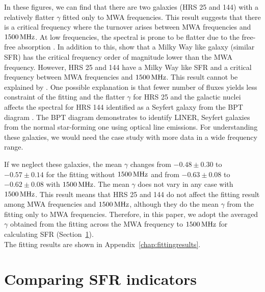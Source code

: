 In these figures, we can find that there are two galaxies (HRS 25 and 144) with a relatively flatter $\gamma$ fitted only to MWA frequencies.
This result suggests that there is a critical frequency where the turnover arises between MWA frequencies and $1500\,\mathrm{MHz}$.
At low frequencies, the spectral is prone to be flatter due to the free-free absorption \citep[e.g.,][]{CalistroRivera2017a, Schober2017, Chyzy2018}.
In addition to this, \citet{Schober2017} show that a Milky Way like galaxy (similar SFR) has the critical frequency order of magnitude lower than the MWA frequency.
However, HRS 25 and 144 have a Milky Way like SFR \citep{Boselli2015} and a critical frequency between MWA frequencies and $1500\,\mathrm{MHz}$.
This result cannot be explained by \citet{Schober2017}.
One possible explanation is that fewer number of fluxes yields less constraint of the fitting and the flatter $\gamma$ for HRS 25 and the galactic nuclei affects the spectral for HRS 144 identified as a Seyfert galaxy from the BPT diagram \citep[e.g.,][]{Baldwin1981, Kewley2001, Kauffmann2003, Schawinski2007}.
The BPT diagram demonstrates to identify LINER, Seyfert galaxies from the normal star-forming one using optical line emissions.
For understanding these galaxies, we would need the case study with more data in a wide frequency range.

If we neglect these galaxies, the mean $\gamma$ changes from $-0.48\pm0.30$ to $-0.57\pm0.14$ for the fitting without $1500\,\mathrm{MHz}$ and from $-0.63\pm0.08$ to $-0.62\pm0.08$ with $1500\,\mathrm{MHz}$.
The mean $\gamma$ does not vary in any case with $1500\,\mathrm{MHz}$.
This result means that HRS 25 and 144 do not affect the fitting result among MWA frequencies and $1500\,\mathrm{MHz}$, although they do the mean $\gamma$ from the fitting only to MWA frequencies.
Therefore, in this paper, we adopt the averaged $\gamma$ obtained from the fitting across the MWA frequency to $1500\,\mathrm{MHz}$ for calculating SFR (Section~\ref{sec:sfrfromlowradio}).\\
The fitting results are shown in Appendix~\ref{chap:fittingresults}.



\section{Comparing SFR indicators}\label{sec:sfrfromlowradio}

